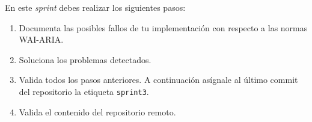\documentclass[11pt,a4paper]{article}
\begin{document}
En este \emph{sprint} debes realizar los siguientes pasos:

\begin{enumerate}
\item Documenta las posibles fallos de tu implementación con respecto
  a las normas WAI-ARIA.

\item Soluciona los problemas detectados.

\item Valida todos los pasos anteriores. A continuación asígnale al último commit del
  repositorio la etiqueta \texttt{sprint3}.

\item Valida el contenido del repositorio remoto.
\end{enumerate}
\end{document}
